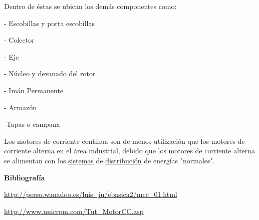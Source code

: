\documentclass[12pt]{article}
\begin{document}
Dentro de éstas se ubican los demás componentes como:\par

- Escobillas y porta escobillas\par

- Colector\par

- Eje\par

- Núcleo y devanado del rotor\par

- Imán Permanente\par

- Armazón\par

-Tapas o campana\par

Los motores de corriente continua son de menos utilización que los motores de corriente alterna en el área industrial, debido que los motores de corriente alterna se alimentan con los \href{https://www.monografias.com/trabajos11/teosis/teosis.shtml}{sistemas} de \href{https://www.monografias.com/trabajos11/travent/travent.shtml}{distribución} de energías "normales".\par

{\fontsize{15pt}{18.0pt}\selectfont \textbf{Bibliografía}\par}\par

\href{http://perso.wanadoo.es/luis_ju/ebasica2/mcc_01.html}{http://perso.wanadoo.es/luis\_ju/ebasica2/mcc\_01.html}\par

\setlength{\parskip}{6.96pt}
\href{http://www.unicrom.com/Tut_MotorCC.asp}{http://www.unicrom.com/Tut\_MotorCC.asp}\par


\printbibliography
\end{document}
